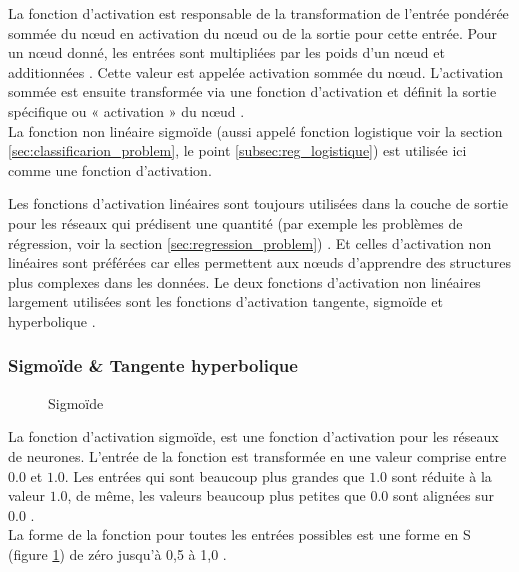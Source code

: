 	La fonction d'activation est responsable de la transformation de l'entrée pondérée sommée du nœud en activation du nœud ou de la sortie pour cette entrée. Pour un nœud donné, les entrées sont multipliées par les poids d'un nœud et additionnées \cite{geron2017hands}. Cette valeur est appelée activation sommée du nœud. L'activation sommée est ensuite transformée via une fonction d'activation et définit la sortie spécifique ou « activation » du nœud \cite{ml2008python}.\\
	La fonction non linéaire sigmoïde (aussi appelé fonction logistique voir la  section \ref{sec:classificarion_problem}, le point \ref{subsec:reg_logistique}) est utilisée ici comme une fonction d'activation.	
	
	Les fonctions d'activation linéaires sont toujours utilisées dans la couche de sortie pour les réseaux qui prédisent une quantité (par exemple les problèmes de régression, voir la section \ref{sec:regression_problem}) \cite{geron2017hands, krizhevsky2012imagenet}. Et celles d'activation non linéaires sont préférées car elles permettent aux nœuds d'apprendre des structures plus complexes dans les données. Le deux fonctions d'activation non linéaires largement utilisées sont les fonctions d'activation tangente, sigmoïde et hyperbolique \cite{goodfellow2016deep}.
	
	\subsubsection{Sigmoïde \& Tangente hyperbolique}
	
	\begin{figure}
		\caption[Sigmoïde graphique]{Sigmoïde}
		\label{fig:sigmoid-graph}
	\end{figure}
	La fonction d'{activation sigmoïde}, est une fonction d'activation pour les réseaux de neurones. L'entrée de la fonction est transformée en une valeur comprise entre $0.0$ et $1.0$. Les entrées qui sont beaucoup plus grandes que $1.0$ sont réduite à la valeur $1.0$, de même, les valeurs beaucoup plus petites que $0.0$ sont alignées sur $0.0$ \cite{krizhevsky2012imagenet}.\\ 
	La forme de la fonction pour toutes les entrées possibles est une forme en S (figure \ref{fig:sigmoid-graph}) de zéro jusqu'à 0,5 à 1,0 \cite{krizhevsky2012imagenet}. %
	
